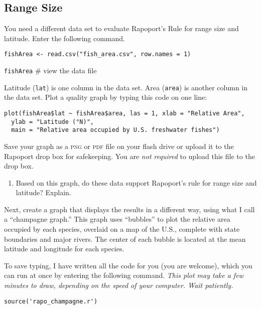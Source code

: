 \documentclass[11pt]{article}
\begin{document}
\subsection*{Range Size}

You need a different data set to evaluate Rapoport's Rule for range 
size and latitude. Enter the following command.

\begin{verbatim}
fishArea <- read.csv("fish_area.csv", row.names = 1)
\end{verbatim}

\texttt{fishArea} \qquad \# view the data file

Latitude (\texttt{lat}) is one column in the data set. Area
(\texttt{area}) is another column in the data set. Plot a quality
graph by typing this code on one line:

\begin{verbatim}
plot(fishArea$lat ~ fishArea$area, las = 1, xlab = "Relative Area",
  ylab = "Latitude (°N)",
  main = "Relative area occupied by U.S. freshwater fishes")
\end{verbatim}

Save your graph as a \textsc{png} or \textsc{pdf} file on your flash 
drive or upload it to the Rapoport drop box for safekeeping. You are 
\emph{not required} to upload this file to the drop box.

\begin{enumerate}[resume]
	\item Based on this graph, do these data support Rapoport's rule 
	for range size and latitude? Explain.

	\vspace{8\baselineskip}

\end{enumerate}

Next, create a graph that displays the results in a different way, 
using what I call a “champagne graph.” This graph uses ``bubbles'' to 
plot the relative area occupied by each species, overlaid on a map of 
the U.S., complete with state boundaries and major rivers.  The center 
of each bubble is located at the mean latitude and longitude for each 
species.

To save typing, I have written all the code for you (you are welcome), 
which you can run at once by entering the following command. \textit{This plot may take a few minutes to draw, depending on the speed of your computer. Wait patiently.}

\begin{verbatim}
source('rapo_champagne.r')
\end{verbatim}
\end{document}
